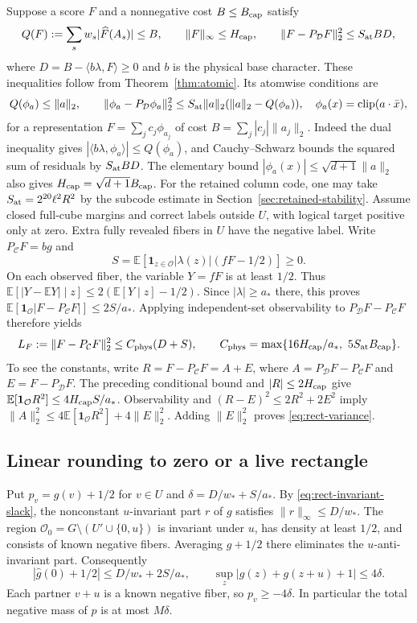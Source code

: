 Suppose a score $F$ and a nonnegative cost $B\le B_{\rm cap}$ satisfy
\[
 Q(F):=\sum_s w_s|\widehat F(A_s)|\le B,\qquad
 \|F\|_\infty\le H_{\rm cap},\qquad
 \|F-P_{\mathcal D}F\|_2^2\le S_{\rm at} B D,
\]
where $D=B-\langle b\lambda,F\rangle\ge0$ and $b$ is the physical
base character. These inequalities follow from Theorem~\ref{thm:atomic}. Its atomwise
conditions are
\[
 Q(\phi_a)\le\|a\|_2,\qquad
 \|\phi_a-P_{\mathcal D}\phi_a\|_2^2
 \le S_{\rm at}\|a\|_2(\|a\|_2-Q(\phi_a)),
 \quad \phi_a(x)=\operatorname{clip}(a\cdot\bar x),
\]
for a representation $F=\sum_jc_j\phi_{a_j}$ of cost
$B=\sum_j|c_j|\|a_j\|_2$. Indeed the dual inequality gives
$|\langle b\lambda,\phi_a\rangle|\le Q(\phi_a)$, and
Cauchy--Schwarz bounds the squared sum of residuals by $S_{\rm at}BD$.
The elementary bound $|\phi_a(x)|\le\sqrt{d+1}\|a\|_2$ also gives
$H_{\rm cap}=\sqrt{d+1}B_{\rm cap}$. For the retained column code, one may take
$S_{\rm at}=2^{20}\ell^2R^2$ by the subcode estimate in
Section~\ref{sec:retained-stability}.
Assume closed full-cube margins and correct labels outside $U$, with
logical target positive only at zero. Extra fully revealed fibers in
$U$ have the negative label. Write $P_{\mathcal C}F=bg$ and
\[
 S=\mathbb E[\mathbf1_{z\in\mathcal O}|\lambda(z)|
                         (fF-1/2)]\ge0.
\]
On each observed fiber, the variable $Y=fF$ is at least $1/2$.
Thus $\mathbb E[|Y-\mathbb EY|\mid z]\le
2(\mathbb E[Y\mid z]-1/2)$. Since $|\lambda|\ge a_*$ there,
this proves
$\mathbb E[\mathbf1_{\mathcal O}|F-P_{\mathcal C}F|]\le2S/a_*$.
Applying independent-set observability to
$P_{\mathcal D}F-P_{\mathcal C}F$ therefore yields
\begin{equation}\label{eq:rect-variance}
 L_F:=\|F-P_{\mathcal C}F\|_2^2
 \le C_{\rm phys}(D+S),\qquad
 C_{\rm phys}=\max\{16H_{\rm cap}/a_*,\ 5S_{\rm at}B_{\rm cap}\}.
\end{equation}
To see the constants, write $R=F-P_{\mathcal C}F=A+E$, where
$A=P_{\mathcal D}F-P_{\mathcal C}F$ and $E=F-P_{\mathcal D}F$.
The preceding conditional bound and $|R|\le2H_{\rm cap}$ give
$\mathbb E[\mathbf1_{\mathcal O}R^2]\le4H_{\rm cap}S/a_*$.
Observability and $(R-E)^2\le2R^2+2E^2$ imply
$\|A\|_2^2\le4\mathbb E[\mathbf1_{\mathcal O}R^2]+4\|E\|_2^2$.
Adding $\|E\|_2^2$ proves \eqref{eq:rect-variance}.

\subsection{Linear rounding to zero or a live rectangle}

Put $p_v=g(v)+1/2$ for $v\in U$ and
$\delta=D/w_*+S/a_*$. By \eqref{eq:rect-invariant-slack}, the nonconstant
$u$-invariant part $r$ of $g$ satisfies $\|r\|_\infty\le D/w_*$.
The region $\mathcal O_0=G\setminus(U'\cup\{0,u\})$ is invariant
under $u$, has density at least $1/2$, and consists of known negative
fibers. Averaging $g+1/2$ there eliminates the $u$-anti-invariant part.
Consequently
\[
 |\widehat g(0)+1/2|\le D/w_*+2S/a_*,\qquad
 \sup_z|g(z)+g(z+u)+1|\le4\delta.
\]
Each partner $v+u$ is a known negative fiber, so $p_v\ge-4\delta$.
In particular the total negative mass of $p$ is at most $M\delta$.

